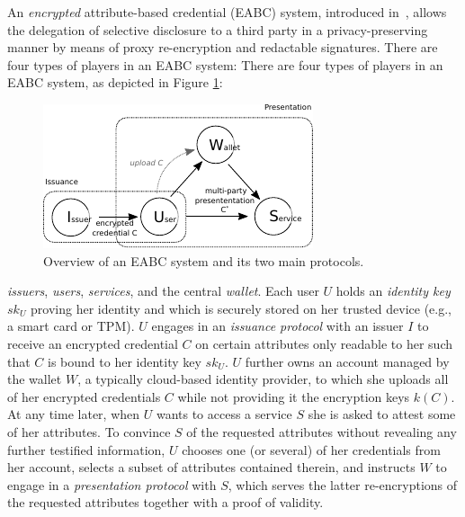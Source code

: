 \documentclass[runningheads]{llncs}
\begin{document}
An \emph{encrypted} attribute-based credential (EABC) system, introduced in~\cite{towardsEABC}, allows the delegation of selective disclosure to a third party in a privacy-preserving manner by means of proxy re-encryption and redactable signatures. 
%
\ifCANS
There are four types of players in an EABC system:
\else
There are four types of players in an EABC system, as depicted in Figure \ref{f:overview}:
\begin{figure}[h]
\centering
\includegraphics[width=0.6\linewidth]{eABC-System.pdf}
\caption{Overview of an EABC system and its two main protocols.} 
\label{f:overview}
\end{figure} 
\fi
\emph{issuers}, \emph{users}, \emph{services}, and the central \emph{wallet}.
Each user $U$ holds an \emph{identity key} $sk_U$ proving her identity and which is securely stored on her trusted device (e.g., a smart card or TPM).
$U$ engages in an \emph{issuance protocol} with an issuer $I$ to receive an encrypted credential $C$ on certain attributes only readable to her such that $C$ is bound to her identity key $sk_U$.
$U$ further owns an %
account managed by the wallet $W$, a typically cloud-based identity provider, to which she uploads all of her encrypted credentials $C$ while not providing it the encryption keys $k(C)$.
At any time later, when $U$ wants to access a service $S$ she is asked to attest some of her attributes. 
To convince $S$ of the requested attributes without revealing any further testified information, $U$ chooses one (or several) of her credentials from her account, selects a subset of attributes contained therein, and instructs $W$ to engage in a \emph{presentation protocol} with $S$, which serves the latter re-encryptions of the requested attributes together with a proof of validity. 
\end{document}
